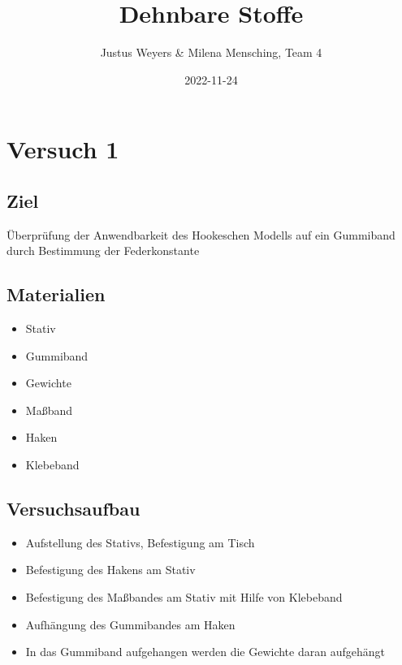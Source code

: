 \documentclass[class=article, crop=false]{standalone}
\title{Dehnbare Stoffe}
\author{Justus Weyers \& Milena Mensching, Team 4}
\date{2022-11-24}
\providecommand{\tightlist}{%
  \setlength{\itemsep}{0pt}\setlength{\parskip}{0pt}}
\begin{document}
\hypertarget{versuch-1}{%
\section{Versuch 1}\label{versuch-1}}

\hypertarget{ziel}{%
\subsection{Ziel}\label{ziel}}

Überprüfung der Anwendbarkeit des Hookeschen Modells auf ein Gummiband
durch Bestimmung der Federkonstante

\hypertarget{materialien}{%
\subsection{Materialien}\label{materialien}}

\begin{itemize}
\tightlist
\item
  Stativ
\item
  Gummiband
\item
  Gewichte
\item
  Maßband
\item
  Haken
\item
  Klebeband
\end{itemize}

\hypertarget{versuchsaufbau}{%
\subsection{Versuchsaufbau}\label{versuchsaufbau}}

\begin{itemize}
\tightlist
\item
  Aufstellung des Stativs, Befestigung am Tisch
\item
  Befestigung des Hakens am Stativ
\item
  Befestigung des Maßbandes am Stativ mit Hilfe von Klebeband
\item
  Aufhängung des Gummibandes am Haken
\item
  In das Gummiband aufgehangen werden die Gewichte daran aufgehängt
\end{itemize}
\end{document}
